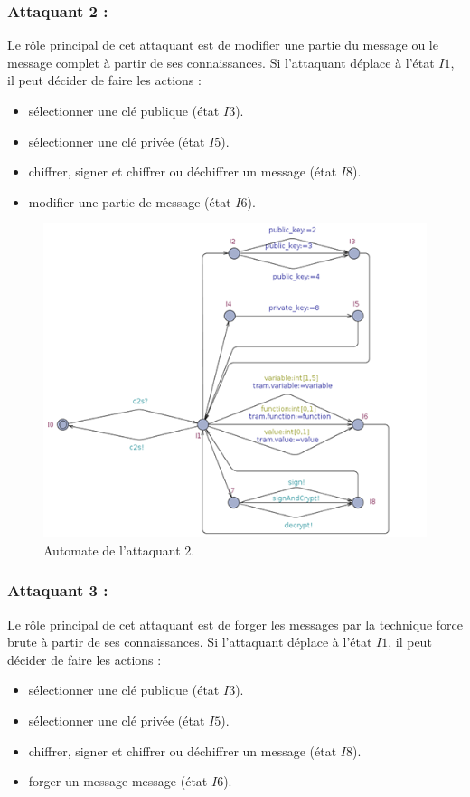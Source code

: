 \documentclass[10pt,a4paper]{article}
\begin{document}
\subsubsection{Attaquant 2 :}
Le rôle principal de cet attaquant est de modifier une partie du message ou le message complet à partir de ses connaissances. Si l'attaquant déplace à l'état $I1$, il peut décider de faire les actions :
\begin{itemize}
\item sélectionner une clé publique (état $I3$).
\item sélectionner une clé privée (état $I5$).
\item chiffrer, signer et chiffrer ou déchiffrer un message (état $I8$).
\item modifier une partie de message (état $I6$).\newpage
\end{itemize}
\begin{figure}[!h]
\centering 
\includegraphics[scale=0.5]{img/attaquant2-500.png}
\caption{Automate de l'attaquant 2.}
\end{figure}
\subsubsection{Attaquant 3 :}
Le rôle principal de cet attaquant est de forger les messages par la technique force brute à partir de ses connaissances. Si l'attaquant déplace à l'état $I1$, il peut décider de faire les actions :  
\begin{itemize}
\item sélectionner une clé publique (état $I3$).
\item sélectionner une clé privée (état $I5$).
\item chiffrer, signer et chiffrer ou déchiffrer un message (état $I8$).
\item forger un message message (état $I6$).
\end{itemize}
\end{document}
